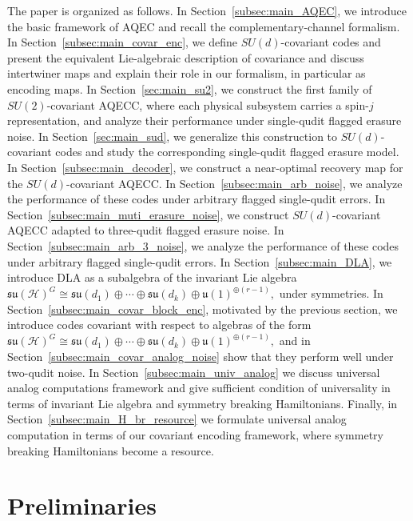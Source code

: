 \documentclass[10pt,twocolumn,superscriptaddress,aps,amsmath,amssymb,citeautoscript,floatfix,prx,longbibliography]{revtex4-2}
\newcounter{alg}
\theoremstyle{plain}
\theoremstyle{plain}
\theoremstyle{plain}
\theoremstyle{plain}
\theoremstyle{plain}
\theoremstyle{plain}
\begin{document}
The paper is organized as follows. In Section~\ref{subsec:main_AQEC}, we introduce the basic framework of AQEC and recall the complementary-channel formalism. In Section~\ref{subsec:main_covar_enc}, we define \(SU(d)\)-covariant codes and present the equivalent Lie-algebraic description of covariance and discuss intertwiner maps and explain their role in our formalism, in particular as encoding maps.
In Section~\ref{sec:main_su2}, we construct the first family of \(SU(2)\)-covariant AQECC, where each physical subsystem carries a spin-\(j\) representation, and analyze their performance under single-qudit flagged erasure noise. In Section~\ref{sec:main_sud}, we generalize this construction to \(SU(d)\)-covariant codes and study the corresponding single-qudit flagged erasure model. In Section~\ref{subsec:main_decoder}, we construct a near-optimal recovery map for the \(SU(d)\)-covariant AQECC. In Section~\ref{subsec:main_arb_noise}, we analyze the performance of these codes under arbitrary flagged single-qudit errors.
In Section~\ref{subsec:main_muti_erasure_noise}, we construct \(SU(d)\)-covariant AQECC adapted to three-qudit flagged erasure noise. In Section~\ref{subsec:main_arb_3_noise}, we analyze the performance of these codes under arbitrary flagged single-qudit errors. In Section~\ref{subsec:main_DLA}, we introduce DLA as a subalgebra of the invariant Lie algebra $
    \mathfrak{su}(\mathcal H)^G
    \cong
    \mathfrak{su}(d_1)\oplus\cdots\oplus\mathfrak{su}(d_k)
    \oplus
    \mathfrak{u}(1)^{\oplus(r-1)},
$ under symmetries. In Section~\ref{subsec:main_covar_block_enc}, motivated by the previous section, we introduce codes covariant with respect to algebras of the form
$
    \mathfrak{su}(\mathcal H)^G
    \cong
    \mathfrak{su}(d_1)\oplus\cdots\oplus\mathfrak{su}(d_k)
    \oplus
    \mathfrak{u}(1)^{\oplus(r-1)},
$
and in Section~\ref{subsec:main_covar_analog_noise} show that they perform well under two-qudit noise. In Section~\ref{subsec:main_univ_analog} we discuss universal analog computations framework and give sufficient condition of universality in terms of invariant Lie algebra and symmetry breaking Hamiltonians. Finally, in Section~\ref{subsec:main_H_br_resource} we formulate universal analog computation in terms of our covariant encoding framework, where symmetry breaking Hamiltonians become a resource.
\color{black}

\section{Preliminaries}\label{sec:main_prelim}
\end{document}
